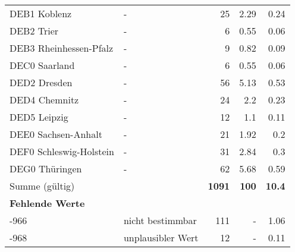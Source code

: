 \begin{longtable}{Xlrrr}
        \multicolumn{1}{X}{DEB1 Koblenz} & - & \num{25} & \num[round-mode=places,round-precision=2]{2.29} & \num[round-mode=places,round-precision=2]{0.24} \\
        \multicolumn{1}{X}{DEB2 Trier} & - & \num{6} & \num[round-mode=places,round-precision=2]{0.55} & \num[round-mode=places,round-precision=2]{0.06} \\
        \multicolumn{1}{X}{DEB3 Rheinhessen-Pfalz} & - & \num{9} & \num[round-mode=places,round-precision=2]{0.82} & \num[round-mode=places,round-precision=2]{0.09} \\
        \multicolumn{1}{X}{DEC0 Saarland} & - & \num{6} & \num[round-mode=places,round-precision=2]{0.55} & \num[round-mode=places,round-precision=2]{0.06} \\
        \multicolumn{1}{X}{DED2 Dresden} & - & \num{56} & \num[round-mode=places,round-precision=2]{5.13} & \num[round-mode=places,round-precision=2]{0.53} \\
        \multicolumn{1}{X}{DED4 Chemnitz} & - & \num{24} & \num[round-mode=places,round-precision=2]{2.2} & \num[round-mode=places,round-precision=2]{0.23} \\
        \multicolumn{1}{X}{DED5 Leipzig} & - & \num{12} & \num[round-mode=places,round-precision=2]{1.1} & \num[round-mode=places,round-precision=2]{0.11} \\
        \multicolumn{1}{X}{DEE0 Sachsen-Anhalt} & - & \num{21} & \num[round-mode=places,round-precision=2]{1.92} & \num[round-mode=places,round-precision=2]{0.2} \\
        \multicolumn{1}{X}{DEF0 Schleswig-Holstein} & - & \num{31} & \num[round-mode=places,round-precision=2]{2.84} & \num[round-mode=places,round-precision=2]{0.3} \\
        \multicolumn{1}{X}{DEG0 Thüringen} & - & \num{62} & \num[round-mode=places,round-precision=2]{5.68} & \num[round-mode=places,round-precision=2]{0.59} \\
     \midrule
      \multicolumn{2}{l}{Summe (gültig)} & \textbf{\num{1091}} &
      \textbf{\num{100}} &
         \textbf{\num[round-mode=places,round-precision=2]{10.4}} \\
     \multicolumn{5}{l}{\textbf{Fehlende Werte}}\\
       -966 & nicht bestimmbar & \num{111} & - & \num[round-mode=places,round-precision=2]{1.06} \\

       -968 & unplausibler Wert & \num{12} & - & \num[round-mode=places,round-precision=2]{0.11} \\


\end{longtable}

